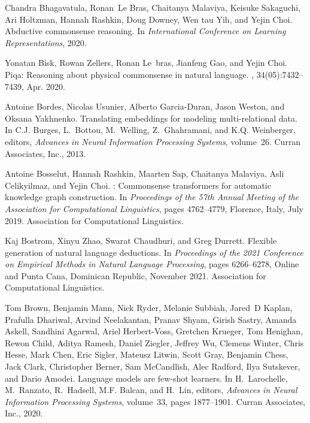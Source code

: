 \documentclass[11pt]{article}
\begin{document}
\begin{thebibliography}{100}
Chandra Bhagavatula, Ronan~Le Bras, Chaitanya Malaviya, Keisuke Sakaguchi, Ari
  Holtzman, Hannah Rashkin, Doug Downey, Wen tau Yih, and Yejin Choi.
\newblock Abductive commonsense reasoning.
\newblock In {\em International Conference on Learning Representations}, 2020.

Yonatan Bisk, Rowan Zellers, Ronan Le~bras, Jianfeng Gao, and Yejin Choi.
\newblock Piqa: Reasoning about physical commonsense in natural language.
,
  34(05):7432--7439, Apr. 2020.

Antoine Bordes, Nicolas Usunier, Alberto Garcia-Duran, Jason Weston, and Oksana
  Yakhnenko.
\newblock Translating embeddings for modeling multi-relational data.
\newblock In C.J. Burges, L.~Bottou, M.~Welling, Z.~Ghahramani, and K.Q.
  Weinberger, editors, {\em Advances in Neural Information Processing Systems},
  volume~26. Curran Associates, Inc., 2013.

Antoine Bosselut, Hannah Rashkin, Maarten Sap, Chaitanya Malaviya, Asli
  Celikyilmaz, and Yejin Choi.
: Commonsense transformers for automatic knowledge graph
  construction.
\newblock In {\em Proceedings of the 57th Annual Meeting of the Association for
  Computational Linguistics}, pages 4762--4779, Florence, Italy, July 2019.
  Association for Computational Linguistics.

Kaj Bostrom, Xinyu Zhao, Swarat Chaudhuri, and Greg Durrett.
\newblock Flexible generation of natural language deductions.
\newblock In {\em Proceedings of the 2021 Conference on Empirical Methods in
  Natural Language Processing}, pages 6266--6278, Online and Punta Cana,
  Dominican Republic, November 2021. Association for Computational Linguistics.

Tom Brown, Benjamin Mann, Nick Ryder, Melanie Subbiah, Jared~D Kaplan, Prafulla
  Dhariwal, Arvind Neelakantan, Pranav Shyam, Girish Sastry, Amanda Askell,
  Sandhini Agarwal, Ariel Herbert-Voss, Gretchen Krueger, Tom Henighan, Rewon
  Child, Aditya Ramesh, Daniel Ziegler, Jeffrey Wu, Clemens Winter, Chris
  Hesse, Mark Chen, Eric Sigler, Mateusz Litwin, Scott Gray, Benjamin Chess,
  Jack Clark, Christopher Berner, Sam McCandlish, Alec Radford, Ilya Sutskever,
  and Dario Amodei.
\newblock Language models are few-shot learners.
\newblock In H.~Larochelle, M.~Ranzato, R.~Hadsell, M.F. Balcan, and H.~Lin,
  editors, {\em Advances in Neural Information Processing Systems}, volume~33,
  pages 1877--1901. Curran Associates, Inc., 2020.


\end{thebibliography}
\end{document}
